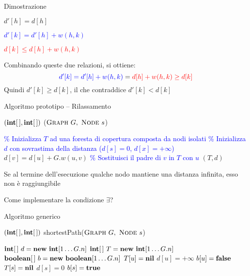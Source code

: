\begin{frame}{Dimostrazione}
\begin{overprint}
\BI
\item {} $d'[h] = d[h]$
\item {} \textcolor{blue}{$d'[k] = d'[h] + w(h,k)$}
\item {} \textcolor{red}{$d[k] \le d[h] + w(h,k)$}
\item Combinando queste due relazioni, si ottiene: 
\[
  \textcolor{blue}{d'[k] = d'[h] + w(h,k)} = \textcolor{red}{d[h] + w(h,k) \ge d[k]}
\]
Quindi $d'[k] \ge d[k]$, il che contraddice $d'[k] < d[k]$
\EI
\end{overprint}

\end{frame}

\begin{frame}{Algoritmo prototipo -- Rilassamento}

\vspace{-9pt}
\begin{Procedure}
\caption[A]{$(\INTARRAY, \INTARRAY)$ \shortestprototype($\textsc{Graph}\ G,\ \textsc{Node}\ s$)}

\textcolor{blue}{\% Inizializza $T$ ad una foresta di copertura composta da nodi isolati}\;
\textcolor{blue}{\% Inizializza $d$ con sovrastima della distanza ($d[s]=0$, $d[x] = +\infty$)}\;
{
  $d[v] = d[u] + G.w(u,v)$\;
  \textcolor{blue}{\% Sostituisci il padre di $v$ in $T$ con $u$}\;
}
\Return $(T,d)$
\end{Procedure}

\vspace{-6pt}
\begin{myboxtitle}[Note]
\BI
\item Se al termine dell'esecuzione qualche nodo mantiene una distanza infinita, esso non è raggiungibile
\item Come implementare la condizione $\exists$?
\EI
\end{myboxtitle}
\end{frame}

\begin{frame}{Algoritmo generico}

\vspace{-9pt}
\begin{Procedure}
\caption[A]{$(\INTARRAY, \INTARRAY)$ \textsf{shortestPath}($\textsc{Graph}\ G,\ \textsc{Node}\ s$)}

$\INTEGER[\,]\ d = \NEW\ \INTEGER[1 \mldots G.n]$
$\INTEGER[\,]\ T = \NEW\ \INTEGER[1 \mldots G.n]$
$\BOOLEAN[\,]\ b = \NEW\ \BOOLEAN[1 \mldots G.n]$
{
  $T[u] = \textbf{nil}$\;
  $d[u] = +\infty$\; 
  $b[u] = \FALSE$\;
}
$T[s] = \textbf{nil}$\; 
$d[s] = 0$\; 
$b[s] = \TRUE$\;
[...]
\end{Procedure}

\end{frame}


